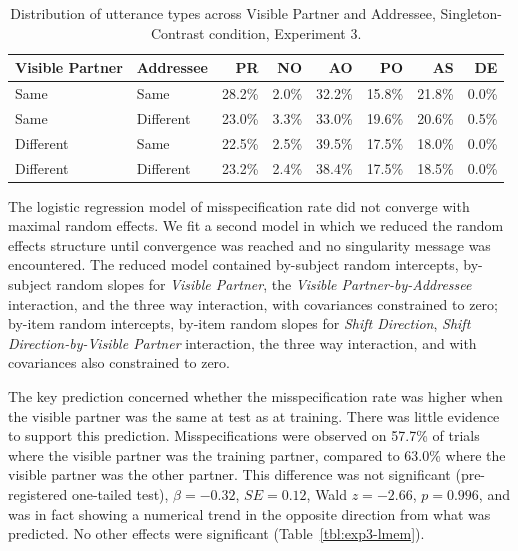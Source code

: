 \documentclass[natbib,doc,a4paper]{apa6}
\begin{document}
\begin{table}[ht]
\centering
\caption{Distribution of utterance types across Visible Partner and Addressee, Singleton-Contrast condition, Experiment 3.} 
\label{tbl:exp3-utt-dist}
\begin{tabular}{llrrrrrr}
  \hline
Visible Partner & Addressee & PR & NO & AO & PO & AS & DE \\ 
  \hline
Same & Same & 28.2\% & 2.0\% & 32.2\% & 15.8\% & 21.8\% & 0.0\% \\ 
  Same & Different & 23.0\% & 3.3\% & 33.0\% & 19.6\% & 20.6\% & 0.5\% \\ 
  Different & Same & 22.5\% & 2.5\% & 39.5\% & 17.5\% & 18.0\% & 0.0\% \\ 
  Different & Different & 23.2\% & 2.4\% & 38.4\% & 17.5\% & 18.5\% & 0.0\% \\ 
   \hline
\end{tabular}
\end{table}

The logistic regression model of misspecification rate did not converge with  maximal random effects. We fit a second model in which we reduced the random effects structure until convergence was reached and no singularity message was encountered. The reduced model contained by-subject random intercepts, by-subject random slopes for \emph{Visible Partner}, the \emph{Visible Partner-by-Addressee} interaction, and the three way interaction, with covariances constrained to zero; by-item random intercepts, by-item random slopes for \emph{Shift Direction}, \emph{Shift Direction-by-Visible Partner} interaction, the three way interaction, and with covariances also constrained to zero.

The key prediction concerned whether the misspecification rate was higher when the visible partner was the same at test as at training. There was little evidence to support this prediction. Misspecifications were observed on 
57.7\%
of trials where the visible partner was the training partner, compared to 
63.0\%
where the visible partner was the other partner.
This difference was not significant (pre-registered one-tailed test), 
\(\beta = -0.32\), \(SE = 0.12\), Wald \(z = -2.66\), \(p = 0.996\), and was in fact showing a numerical trend in the opposite direction from what was predicted. No other effects were significant (Table~\ref{tbl:exp3-lmem}).
\end{document}
